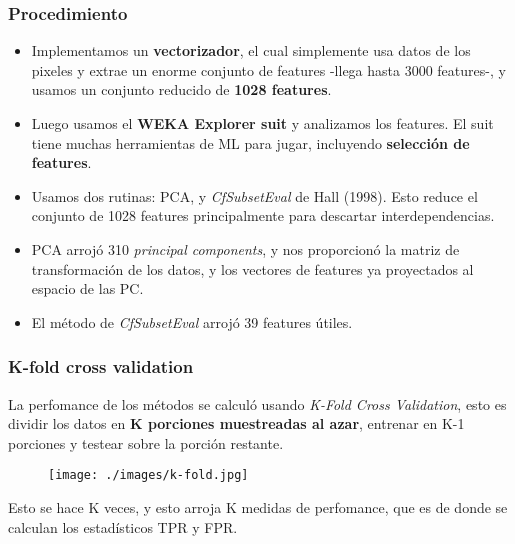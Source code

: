 \documentclass[10pt]{beamer}
\begin{document}
\begin{frame}\frametitle{Procedimiento}
\begin{itemize}[<+->]
 \item Implementamos un \textbf{vectorizador}, el cual simplemente usa datos de los pixeles
y extrae un enorme conjunto de features -llega hasta 3000 features-, 
y usamos un conjunto reducido de \textbf{1028 features}.
 \item Luego usamos el \textbf{WEKA Explorer suit} y analizamos los features.
El suit tiene muchas herramientas de ML para jugar, incluyendo \textbf{selecci\'on de features}.
 \item Usamos dos rutinas: PCA, y \textit{CfSubsetEval} de Hall (1998). Esto reduce el conjunto de 1028
features principalmente para descartar interdependencias.
 \item PCA arroj\'o 310 \textit{principal components}, y nos proporcion\'o la matriz de transformaci\'on de
 los datos, y los vectores de features ya proyectados al espacio de las PC.
 \item El m\'etodo de \textit{CfSubsetEval} arroj\'o 39 features \'utiles.
\end{itemize}
\end{frame}
\begin{frame}\frametitle{K-fold cross validation}
 La perfomance de los m\'etodos se calcul\'o usando \textit{K-Fold Cross Validation}, 
 esto es dividir los datos en \textbf{K porciones muestreadas al azar}, entrenar
 en K-1 porciones y testear sobre la porci\'on restante. 
 \begin{figure}
 \texttt{[image: ./images/k-fold.jpg]}
\end{figure}
 Esto se hace K veces, y esto arroja K medidas de perfomance, 
 que es de donde se calculan los estad\'{i}sticos TPR y FPR.
\end{frame}
\end{document}
